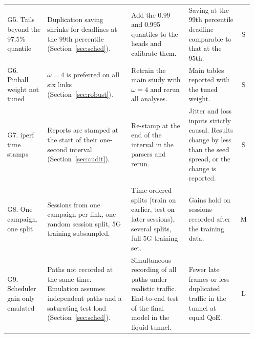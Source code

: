 \begin{table}[htbp]
\begin{tabularx}{\linewidth}{>{\raggedright\arraybackslash}p{2.6cm}>{\raggedright\arraybackslash}X>{\raggedright\arraybackslash}X>{\raggedright\arraybackslash}p{3.0cm}c}
G5. Tails beyond the 97.5\% quantile & Duplication saving shrinks for deadlines at the 99th percentile (Section~\ref{sec:sched}). & Add the 0.99 and 0.995 quantiles to the heads and calibrate them. & Saving at the 99th percentile deadline comparable to that at the 95th. & S \\
G6. Pinball weight not tuned & $\omega=4$ is preferred on all six links (Section~\ref{sec:robust}). & Retrain the main study with $\omega=4$ and rerun all analyses. & Main tables reported with the tuned weight. & S \\
G7. iperf time stamps & Reports are stamped at the start of their one-second interval (Section~\ref{sec:audit}). & Re-stamp at the end of the interval in the parsers and rerun. & Jitter and loss inputs strictly causal. Results change by less than the seed spread, or the change is reported. & S \\
G8. One campaign, one split & Sessions from one campaign per link, one random session split, 5G training subsampled. & Time-ordered splits (train on earlier, test on later sessions), several splits, full 5G training set. & Gains hold on sessions recorded after the training data. & M \\
G9. Scheduler gain only emulated & Paths not recorded at the same time. Emulation assumes independent paths and a saturating test load (Section~\ref{sec:sched}). & Simultaneous recording of all paths under realistic traffic. End-to-end test of the final model in the liquid tunnel. & Fewer late frames or less duplicated traffic in the tunnel at equal QoE. & L \\
\bottomrule
\end{tabularx}
\end{table}

